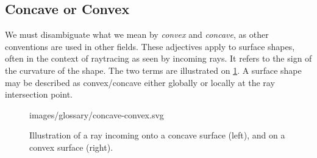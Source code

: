 \subsection{Concave or Convex}
We must disambiguate what we mean by \emph{convex} and \emph{concave}, as other
conventions are used in other fields. These adjectives apply to surface
shapes, often in the context of raytracing as seen by incoming rays.
It refers to the sign of the curvature of the shape.  The two terms are
illustrated on \cref{fig:concave-convex}. A surface shape may be described as
convex/concave either globally or locally at the ray intersection point.

\begin{figure} \caption{\label{fig:concave-convex} Illustration of a
ray incoming onto a concave surface (left), and on a convex surface (right).}

           {images/glossary/concave-convex.svg}
\end{figure}
